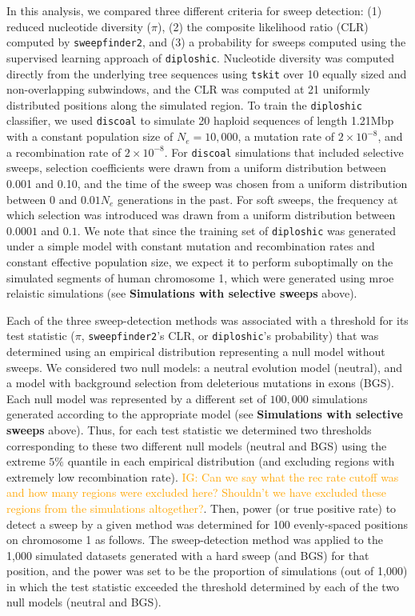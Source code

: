 \documentclass[hidelinks]{article}
\newcommand{\tskit}{\texttt{tskit}\xspace}
\newcommand{\sweepfinder}{\texttt{sweepfinder2}\xspace}
\newcommand{\diploshic}{\texttt{diploshic}\xspace}
\newcommand{\igcomment}[1]{\textcolor{orange}{IG: #1}}
\begin{document}
    In this analysis, we compared three different criteria for sweep detection:
    (1) reduced nucleotide diversity ($\pi$),
    (2) the composite likelihood ratio (CLR) computed by \sweepfinder \citep{degiorgio2016sweepfinder2},
    and (3) a probability for sweeps computed using the supervised learning approach of \diploshic \citep{kern2018diplos}.
    Nucleotide diversity was computed directly from the underlying tree sequences using \tskit \citep{ralph2020efficiently}
    over 10 equally sized and non-overlapping subwindows, and 
    the CLR was computed at 21 uniformly distributed positions along the simulated region.
    To train the \diploshic classifier, we used \texttt{discoal} \citep{kern2016discoal} to simulate 20 haploid sequences of length 1.21Mbp
    with a constant population size of $N_e=10,000$, a mutation rate of $2\times 10^{-8}$, and a recombination rate of $2\times 10^{-8}$.
    For \texttt{discoal} simulations that included selective sweeps,
    selection coefficients were drawn from a uniform distribution between 0.001 and 0.10,
    and the time of the sweep was chosen from a uniform distribution between 0 and $0.01N_e$ generations in the past.
    For soft sweeps, the frequency at which selection was introduced was drawn from a uniform distribution between $0.0001$ and $0.1$.
    We note that since the training set of \diploshic was generated under a simple model with
    constant mutation and recombination rates and constant effective population size,
    we expect it to perform suboptimally on the simulated segments of human chromosome 1,
    which were generated using mroe relaistic simulations (see \textbf{Simulations with selective sweeps} above).

    Each of the three sweep-detection methods was associated with a threshold for its test statistic ($\pi$, \sweepfinder's CLR, or \diploshic's probability)
    that was determined using an empirical distribution representing a null model without sweeps.
    We considered two null models: a neutral evolution model (neutral),
    and a model with background selection from deleterious mutations in exons (BGS).
    Each null model was represented by a different set of $100,000$ simulations generated according to the appropriate model
    (see \textbf{Simulations with selective sweeps} above).
    Thus, for each test statistic we determined two thresholds corresponding to these two different null models (neutral and BGS)
    using the extreme $5\%$ quantile in each empirical distribution (and excluding regions with extremely low recombination rate).
    \igcomment{Can we say what the rec rate cutoff was and how many regions were excluded here?
    Shouldn't we have excluded these regions from the simulations altogether?}.
    Then, power (or true positive rate) to detect a sweep by a given method was determined for
    100 evenly-spaced positions on chromosome 1 as follows.
    The sweep-detection method was applied to the 1,000 
    simulated datasets generated with a hard sweep (and BGS) for that position,
    and the power was set to be the proportion of simulations (out of 1,000)
    in which the test statistic exceeded the threshold determined by each of the two null models (neutral and BGS).
\end{document}
